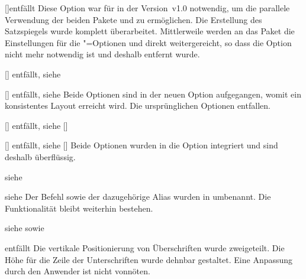 \begin{Declaration}{[\PSet]}{entfällt}
\printdeclarationlist*%
%
Diese Option war für \TUDScript in der Version~v1.0 notwendig, um die parallele 
Verwendung der beiden Pakete  und  zu 
ermöglichen. Die Erstellung des Satzspiegels wurde komplett überarbeitet. 
Mittlerweile werden an das Paket  die Einstellungen für die 
\KOMAScript"=Optionen  und  direkt 
weitergereicht, so dass die Option  nicht mehr notwendig ist 
und deshalb entfernt wurde.
\end{Declaration}

\begin{Declaration}{[\PBoolean]}{%
  entfällt, siehe %
}
\begin{Declaration}{[\PBoolean]}{%
  entfällt, siehe %
}
\printdeclarationlist*%
%
Beide Optionen sind in der neuen Option  
aufgegangen, womit ein konsistentes Layout erreicht wird. Die ursprünglichen 
Optionen entfallen. 
\end{Declaration}
\end{Declaration}

\begin{Declaration}{[\PBoolean]}{%
  entfällt, siehe [\PSet]%
}
\begin{Declaration}{[\PBoolean]}{%
  entfällt, siehe [\PSet]%
}
\printdeclarationlist*%
%
Beide Optionen wurden in die Option  integriert und sind 
deshalb überflüssig.
\end{Declaration}
\end{Declaration}

\begin{Declaration}{}%
  {siehe %
}
\begin{Declaration}{}%
  {siehe %
}
\printdeclarationlist*%
%
Der Befehl  sowie der dazugehörige Alias  
wurden in  umbenannt. Die Funktionalität bleibt weiterhin 
bestehen.
\end{Declaration}
\end{Declaration}

\begin{Declaration}{}{%
  siehe  sowie 
}
\begin{Declaration}{}{entfällt}
\printdeclarationlist*%
%
Die vertikale Positionierung von Überschriften wurde zweigeteilt. Die Höhe für 
die Zeile der Unterschriften wurde dehnbar gestaltet. Eine Anpassung durch den 
Anwender ist nicht vonnöten.
\end{Declaration}
\end{Declaration}

